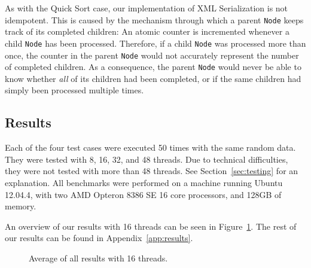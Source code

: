 As with the Quick Sort case, our implementation of XML Serialization is not idempotent. This is caused by the mechanism through which a parent \texttt{Node} keeps track of its completed children: An atomic counter is incremented whenever a child \texttt{Node} has been processed. Therefore, if a child \texttt{Node} was processed more than once, the counter in the parent \texttt{Node} would not accurately represent the number of completed children. As a consequence, the parent \texttt{Node} would never be able to know whether \emph{all} of its children had been completed, or if the same children had simply been processed multiple times.

\subsection{Results}
Each of the four test cases were executed 50 times with the same random data. They were
tested with 8, 16, 32, and 48 threads. Due to technical difficulties, they were
not tested with more than 48 threads. See Section~\ref{sec:testing} for an
explanation. All benchmarks were performed on a machine running 
Ubuntu 12.04.4, with two AMD Opteron 8386 SE 16 core processors, and 128GB of
memory.

An overview of our results with 16 threads can be seen in Figure~\ref{fig:all_results}. The rest of our results can be found in Appendix~\ref{app:results}.

\begin{figure}
\caption{Average of all results with 16 threads.}
\label{fig:all_results}
\end{figure}
